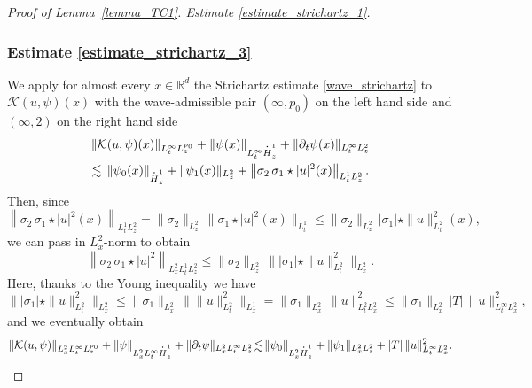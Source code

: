 \documentclass[11pt]{article}
\DeclareRobustCommand{\accentset}[2]{\overset{#1}{#2}}
\theoremstyle{definition}
\newcommand*{\overbigdot}[1]{%
\accentset{\mbox{\large\bfseries .}}{#1}}
\newenvironment{ProofOf}[1]{\begin{proof}[Proof of #1]}{\end{proof}}
\newcommand{\R}{\mathbb{R}}
\begin{document}
\begin{ProofOf}{Lemma~\ref{lemma_TC1}. Estimate \eqref{estimate_strichartz_1}}
\subsubsection*{Estimate \eqref{estimate_strichartz_3}} We apply for almost every $x\in\R^{d}$ the Strichartz estimate \eqref{wave_strichartz} to $\mathcal{K}(u,\psi)(x)$ with the wave-admissible pair $(\infty,p_{0})$ on the left hand side and $(\infty,2)$ on the right hand side\vspace*{-3pt}
\begin{multline*}
\|\mathcal{K}(u,\psi)(x)\|_{L_{t}^{\infty}L_{z}^{p_{0}}}+\|\psi(x)\|_{L_{t}^{\infty}\overbigdot{H}_{z}^{1}}+\|\partial_{t}\psi(x)\|_{L_{t}^{\infty}L_{z}^{2}}\\
\lesssim\,\|\psi_{0}(x)\|_{\overbigdot{H}_{z}^{1}}+\|\psi_{1}(x)\|_{L_{z}^{2}}+\left\|\sigma_{2}\,\sigma_{1}\star|u|^{2}(x)\right\|_{L_{t}^{1}L_{z}^{2}}.
\end{multline*}
Then, since\vspace*{-3pt}
\[
\left\|\sigma_{2}\,\sigma_{1}\star|u|^{2}(x)\right\|_{L_{t}^{1}L_{z}^{2}}=\|\sigma_{2}\|_{L_{z}^{2}}\,\|\sigma_{1}\star|u|^{2}(x)\|_{L_{t}^{1}}\leq\|\sigma_{2}\|_{L_{z}^{2}}\,|\sigma_{1}|\star\|u\|_{L_{t}^{2}}^{2}(x),
\]
we can pass in $L_{x}^{2}$-norm to obtain\vspace*{-3pt}
\[
\left\|\sigma_{2}\,\sigma_{1}\star|u|^{2}\right\|_{L_{x}^{2}L_{t}^{1}L_{z}^{2}}\leq\|\sigma_{2}\|_{L_{z}^{2}}\,\bigl\||\sigma_{1}|\star\|u\|_{L_{t}^{2}}^{2}\bigr\|_{L_{x}^{2}}.
\]
Here, thanks to the Young inequality we have
\[
\bigl\||\sigma_{1}|\star\|u\|_{L_{t}^{2}}^{2}\bigr\|_{L_{x}^{2}}\leq \|\sigma_{1}\|_{L_{x}^{2}}\,\bigl\|\|u\|_{L_{t}^{2}}^{2}\bigr\|_{L_{x}^{1}}=\|\sigma_{1}\|_{L_{x}^{2}}\,\|u\|_{L_{t}^{2}L_{x}^{2}}^{2}\leq \|\sigma_{1}\|_{L_{x}^{2}}\,|T|\,\|u\|_{L_{t}^{\infty}L_{x}^{2}}^{2},
\]
and we eventually obtain\vspace*{-3pt}
\[
\|\mathcal{K}(u,\psi)\|_{L_{x}^{2}L_{t}^{\infty}L_{z}^{p_{0}}}+\|\psi\|_{L_{x}^{2}L_{t}^{\infty}\overbigdot{H}_{z}^{1}}+\|\partial_{t}\psi\|_{L_{x}^{2}L_{t}^{\infty}L_{z}^{2}}\!\lesssim\!\|\psi_{0}\|_{L_{x}^{2}\overbigdot{H}_{z}^{1}}+\|\psi_{1}\|_{L_{x}^{2}L_{z}^{2}}+|T|\,\|u\|_{L_{t}^{\infty}L_{x}^{2}}^{2}.
\]


\end{ProofOf}
\end{document}
